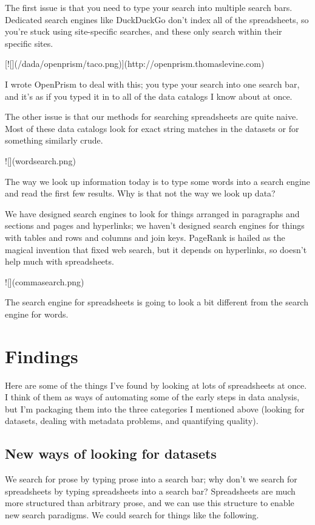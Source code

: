 \documentclass{acm_proc_article-sp}
\begin{document}
The first issue is that you need to type your search into multiple search
bars. Dedicated search engines like DuckDuckGo don't index all of the
spreadsheets, so you're stuck using site-specific searches, and these only
search within their specific sites.

[![](/dada/openprism/taco.png)](http://openprism.thomaslevine.com)

I wrote OpenPrism to deal with this; you type your search into one search
bar, and it's as if you typed it in to all of the data catalogs I know about
at once.

The other issue is that our methods for searching spreadsheets are quite naive.
Most of these data catalogs look for exact string matches in the datasets or
for something similarly crude.

![](wordsearch.png)

The way we look up information today is to type some words into a search engine
and read the first few results. Why is that not the way we look up data?

We have designed search engines to look for things arranged in paragraphs
and sections and pages and hyperlinks; we haven't designed search engines for
things with tables and rows and columns and join keys.
PageRank is hailed as the magical invention that
fixed web search, but it depends on hyperlinks, so doesn't help much with spreadsheets.

![](commasearch.png)

The search engine for spreadsheets is going to look a bit different from
the search engine for words.















\section{Findings}
Here are some of the things I've found by looking at lots of spreadsheets at
once. I think of them as ways of automating some of the early steps in data
analysis, but I'm packaging them into the three categories I mentioned above
(looking for datasets, dealing with metadata problems, and quantifying quality).

\subsection{New ways of looking for datasets}
We search for prose by typing prose into a search bar; why don't
we search for spreadsheets by typing spreadsheets into a search bar?
Spreadsheets are much more structured than arbitrary prose, and we
can use this structure to enable new search paradigms. We could search
for things like the following.
\end{document}
